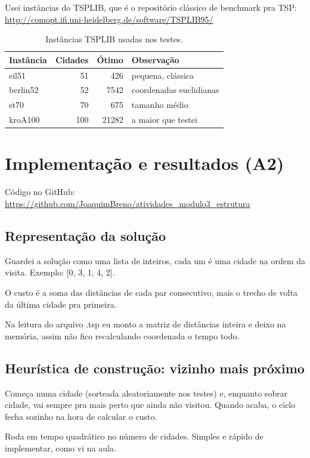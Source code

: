 \documentclass[12pt,a4paper]{article}
\begin{document}
Usei instâncias do TSPLIB, que é o repositório clássico de benchmark pra TSP: \url{http://comopt.ifi.uni-heidelberg.de/software/TSPLIB95/}

\begin{table}[h]
\centering
\begin{tabular}{lrrl}
\hline
Instância & Cidades & Ótimo & Observação \\
\hline
eil51     & 51  & 426   & pequena, clássica \\
berlin52  & 52  & 7542  & coordenadas euclidianas \\
st70      & 70  & 675   & tamanho médio \\
kroA100   & 100 & 21282 & a maior que testei \\
\hline
\end{tabular}
\caption{Instâncias TSPLIB usadas nos testes.}
\end{table}

\section{Implementação e resultados (A2)}

Código no GitHub:
\url{https://github.com/JoaquimBreno/atividades_modulo3_estrutura}

\subsection{Representação da solução}

Guardei a solução como uma lista de inteiros, cada um é uma cidade na ordem da visita. Exemplo: [0, 3, 1, 4, 2].

O custo é a soma das distâncias de cada par consecutivo, mais o trecho de volta da última cidade pra primeira.

Na leitura do arquivo .tsp eu monto a matriz de distâncias inteira e deixo na memória, assim não fico recalculando coordenada o tempo todo.

\subsection{Heurística de construção: vizinho mais próximo}

Começa numa cidade (sorteada aleatoriamente nos testes) e, enquanto sobrar cidade, vai sempre pra mais perto que ainda não visitou. Quando acaba, o ciclo fecha sozinho na hora de calcular o custo.

Roda em tempo quadrático no número de cidades. Simples e rápido de implementar, como vi na aula.
\end{document}

